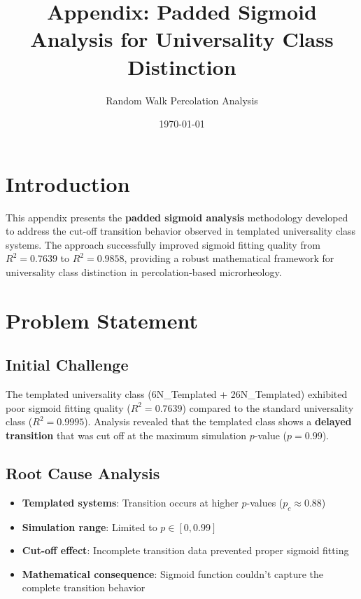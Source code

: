 \documentclass[11pt]{article}
\title{Appendix: Padded Sigmoid Analysis for Universality Class Distinction}
\author{Random Walk Percolation Analysis}
\date{\today}
\begin{document}
\maketitle

\section{Introduction}

This appendix presents the \textbf{padded sigmoid analysis} methodology developed to address the cut-off transition behavior observed in templated universality class systems. The approach successfully improved sigmoid fitting quality from $R^2 = 0.7639$ to $R^2 = 0.9858$, providing a robust mathematical framework for universality class distinction in percolation-based microrheology.

\section{Problem Statement}

\subsection{Initial Challenge}

The templated universality class (6N\_Templated + 26N\_Templated) exhibited poor sigmoid fitting quality ($R^2 = 0.7639$) compared to the standard universality class ($R^2 = 0.9995$). Analysis revealed that the templated class shows a \textbf{delayed transition} that was cut off at the maximum simulation $p$-value ($p = 0.99$).

\subsection{Root Cause Analysis}

\begin{itemize}
    \item \textbf{Templated systems}: Transition occurs at higher $p$-values ($p_c \approx 0.88$)
    \item \textbf{Simulation range}: Limited to $p \in [0, 0.99]$
    \item \textbf{Cut-off effect}: Incomplete transition data prevented proper sigmoid fitting
    \item \textbf{Mathematical consequence}: Sigmoid function couldn't capture the complete transition behavior
\end{itemize}
\end{document}
